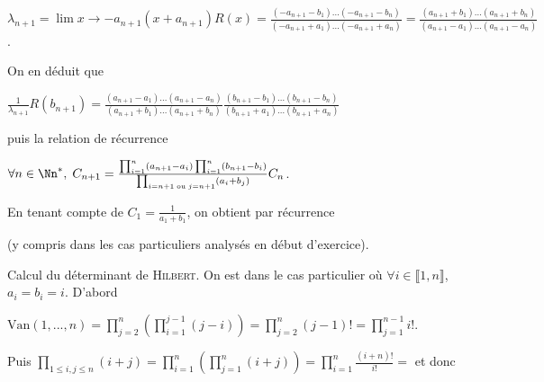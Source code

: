 {{\begin{center}
$\lambda_{n+1}=\lim{x \rightarrow -a_{n+1}}(x+a_{n+1})R(x)=\frac{(-a_{n+1}-b_1)\ldots(-a_{n+1}-b_n)}{(-a_{n+1}+a_1)\ldots(-a_{n+1}+a_n)}=\frac{(a_{n+1}+b_1)\ldots(a_{n+1}+b_n)}{(a_{n+1}-a_1)\ldots(a_{n+1}-a_n)}$.
\end{center}

On en déduit que

\begin{center}
$\frac{1}{\lambda_{n+1}} R(b_{n+1}) =\frac{(a_{n+1}-a_1)\ldots(a_{n+1}-a_n)}{(a_{n+1}+b_1)\ldots(a_{n+1}+b_n)}\frac{(b_{n+1}-b_1)\ldots(b_{n+1}-b_n)}{(b_{n+1}+a_1)\ldots(b_{n+1}+a_n)}$
\end{center}

puis la relation de récurrence

\begin{center}
$\forall n\in\Nn^*,\;C_{n+1}=\frac{\prod_{i=1}^{n}(a_{n+1}-a_i)\prod_{i=1}^{n}(b_{n+1}-b_i)}{\prod_{i=n+1\;\text{ou}\;j=n+1}(a_{i}+b_j)}C_n$.
\end{center}

En tenant compte de $C_1=\frac{1}{a_1+b_1}$, on obtient par récurrence

\begin{center}
\end{center}

(y compris dans les cas particuliers analysés en début d'exercice).

Calcul du déterminant de \textsc{Hilbert}. On est dans le cas particulier où $\forall i\in\llbracket1,n\rrbracket$, $a_i = b_i = i$.
D'abord

\begin{center}
$\text{Van}(1,...,n)=\prod_{j=2}^{n}\left(\prod_{i=1}^{j-1}(j-i)\right)=\prod_{j=2}^{n}(j-1)! =\prod_{j=1}^{n-1}i!$.
\end{center}

Puis $\prod_{1\leqslant i,j\leqslant n}^{}(i+j)=\prod_{i=1}^{n}\left(\prod_{j=1}^{n}(i+j)\right)=\prod_{i=1}^{n}\frac{(i+n)!}{i!}=$   et donc

\begin{center}
\end{center}}
}